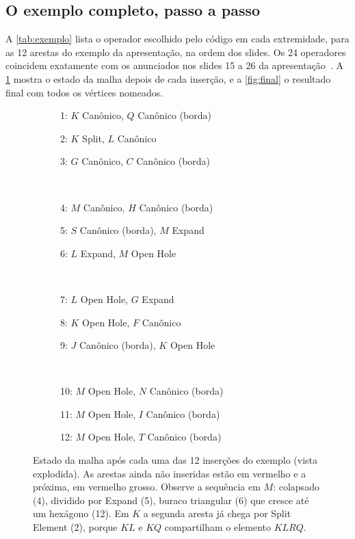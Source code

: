 \subsection{O exemplo completo, passo a passo}
\label{sec:exemplo}

A \cref{tab:exemplo} lista o operador escolhido pelo código em cada extremidade, para as 12 arestas do exemplo da
apresentação, na ordem dos slides. Os 24 operadores coincidem exatamente com os anunciados nos slides 15 a 26 da
apresentação~\cite{slides}. A \cref{fig:passos} mostra o estado da malha depois de cada inserção, e a
\cref{fig:final} o resultado final com todos os vértices nomeados.

\begin{table}[ht]
\centering\small

\caption{Operadores escolhidos pelo código no exemplo (IBHM, malha ). $X_i$ é a $i$-ésima cópia
criada do vértice $X$. A coluna $A$--$B$ mostra a orientação da half-edge usada (por isso a aresta 1, ``$QK$'' nos
slides, aparece como $K$--$Q$).}
\label{tab:exemplo}
\end{table}

\begin{figure}[p]
\centering
\newcommand{\passo}[2]{\begin{subfigure}[t]{0.32\linewidth}\centering\caption*{\scriptsize #2}\end{subfigure}}
\passo{01}{1: $K$ Canônico, $Q$ Canônico (borda)}\hfill
\passo{02}{2: $K$ Split, $L$ Canônico}\hfill
\passo{03}{3: $G$ Canônico, $C$ Canônico (borda)}\\[3pt]
\passo{04}{4: $M$ Canônico, $H$ Canônico (borda)}\hfill
\passo{05}{5: $S$ Canônico (borda), $M$ Expand}\hfill
\passo{06}{6: $L$ Expand, $M$ Open Hole}\\[3pt]
\passo{07}{7: $L$ Open Hole, $G$ Expand}\hfill
\passo{08}{8: $K$ Open Hole, $F$ Canônico}\hfill
\passo{09}{9: $J$ Canônico (borda), $K$ Open Hole}\\[3pt]
\passo{10}{10: $M$ Open Hole, $N$ Canônico (borda)}\hfill
\passo{11}{11: $M$ Open Hole, $I$ Canônico (borda)}\hfill
\passo{12}{12: $M$ Open Hole, $T$ Canônico (borda)}
\caption{Estado da malha após cada uma das 12 inserções do exemplo (vista explodida). As arestas ainda não inseridas
estão em vermelho e a próxima, em vermelho grosso. Observe a sequência em $M$: colapsado (4), dividido por Expand (5),
buraco triangular (6) que cresce até um hexágono (12). Em $K$ a segunda aresta já chega por Split Element (2), porque
$KL$ e $KQ$ compartilham o elemento $KLRQ$.}
\label{fig:passos}
\end{figure}

